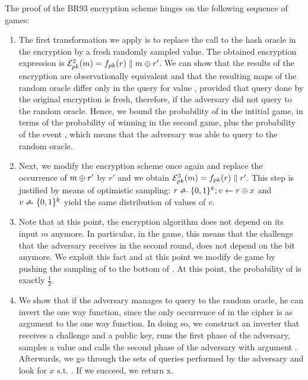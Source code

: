 The proof of the BR93 encryption scheme hinges on the following
sequence of games:
\begin{enumerate}
\item The first transformation we apply is to replace the call to the
  hash oracle in the encryption by a fresh randomly sampled value. The
  obtained encryption expression is $\mathcal{E}^2_{pk}(m) = f_{pk}(r) \parallel
  m \oplus r'$. We can show that the results of the encryption are
  observationally equivalent and that the resulting maps of the random
  oracle differ only in the query for value , provided that
  query done by the original encryption is fresh, therefore, if the
  adversary did not query  to the random oracle. Hence, we bound
  the probability of  in the intitial game, in terms of the
  probability of winning in the second game, plus the probability of
  the event , which means that the adversary was
  able to query  to the random oracle.

\item Next, we modify the encryption scheme once again and replace the
  occurrence of $m\oplus r'$ by $r'$ and we obtain $\mathcal{E}^3_{pk}(m) =
  f_{pk}(r) \parallel r'$. This step is justified by means of optimistic
  sampling: $\Rand{r}{\bitstring{k};\Ass{v}{r\xor x}}$ and
  $\Rand{v}{\bitstring{k}}$ yield the same distribution of values of
  $v$.

\item  Note that at this point, the encryption algorithm does not depend on
  its input $m$ anymore. In particular, in the  game, this
  means that the challenge  that the adversary receives in the
  second round, does not depend on the bit  anymore. We exploit
  this fact and at this point we modify de  game by pushing
  the sampling of  to the bottom of . At this point,
  the probability of  is exactly $\frac{1}{2}$.

\item We show that if the adversary manages to query  to the
  random oracle, he can invert the one way function, since the only
  occurrence of  in the cipher is as argument to the one way
  function. In doing so, we construct an inverter that receives a
  challenge  and a public key, runs the first phase of the
  adversary, samples a value  and calls the second phase of the
  adversary with argument . Afterwards, we go through
  the sets of queries performed by the adversary and look for $x$
  s.t. . If we succeed, we return x.
\end{enumerate}

